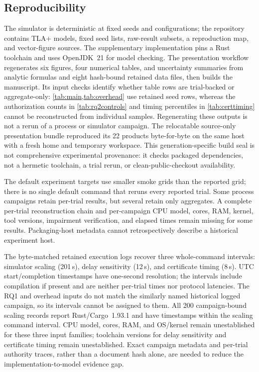 \subsection{Reproducibility}
The simulator is deterministic at fixed seeds and configurations; the repository
contains TLA+ models, fixed seed lists, raw-result subsets, a reproduction map,
and vector-figure sources. The supplementary implementation pins a Rust toolchain
and uses OpenJDK~21 for model checking. The presentation workflow regenerates six
figures, four numerical tables, and uncertainty summaries from analytic formulas
and eight hash-bound retained data files, then builds the manuscript. Its input
checks identify whether table rows are trial-backed or aggregate-only:
\cref{tab:main,tab:overhead} use retained seed rows, whereas the authorization
counts in \cref{tab:rq2controls} and timing percentiles in \cref{tab:certtiming}
cannot be reconstructed from individual samples. Regenerating these outputs is
not a rerun of a process or simulator campaign. The relocatable source-only
presentation bundle reproduced its 22 products byte-for-byte on the same host
with a fresh home and temporary workspace. This generation-specific build seal
is not comprehensive experimental provenance: it checks packaged dependencies,
not a hermetic toolchain, a trial rerun, or clean-public-checkout availability.

The default experiment targets use smaller smoke grids than the reported grid;
there is no single default command that reruns every reported trial. Some process
campaigns retain per-trial results, but several retain only aggregates. A
complete per-trial reconstruction chain and per-campaign CPU model, cores, RAM,
kernel, tool versions, impairment verification, and elapsed times remain missing
for some results. Packaging-host metadata cannot retrospectively describe a
historical experiment host.

The byte-matched retained execution logs recover three whole-command intervals:
simulator scaling (201\,s), delay sensitivity (12\,s), and certificate timing (8\,s).
UTC start/completion timestamps have one-second resolution;
the intervals include compilation if present and are neither per-trial times nor
protocol latencies. The RQ1 and overhead inputs do not match the similarly named
historical logged campaign, so its intervals cannot be assigned to them.
All 200 campaign-bound scaling records report Rust/Cargo~1.93.1 and have timestamps
within the scaling command interval. CPU model, cores, RAM, and OS/kernel remain
unestablished for these three input families; toolchain versions for delay sensitivity and certificate timing remain unestablished.
Exact campaign metadata and per-trial
authority traces, rather than a document hash alone, are needed to reduce the
implementation-to-model evidence gap.
